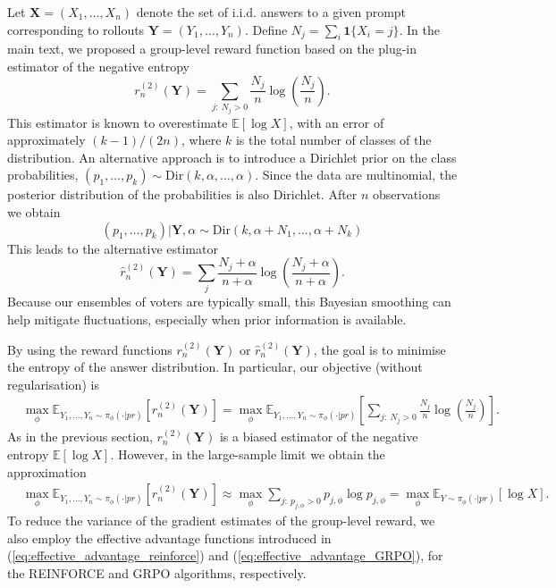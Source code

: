 Let $\mathbf{X} = (X_1, \dots, X_n)$ denote the set of i.i.d. answers to a given prompt corresponding to rollouts  $\mathbf{Y} = (Y_1, \dots, Y_n)$. Define $N_j = \sum_i \mathbf{1}\{X_i = j\}$. In the main text, we proposed a group-level reward function based on the plug-in estimator of the negative entropy
\begin{equation*}
    r_n^{(2)}(\mathbf{Y})=\sum_{j:\ N_j>0}\frac{N_j}{n}\log\left(\frac{N_j}{n}\right).
\end{equation*}
This estimator is known to overestimate $\mathbb{E}[\log X]$, with an error of approximately $(k-1)/(2n)$, where $k$ is the total number of classes of the distribution. An alternative approach is to introduce a Dirichlet prior on the class probabilities, $(p_1, \dots, p_k)\sim\text{Dir}(k, \alpha, \dots, \alpha)$.
Since the data are multinomial, the posterior distribution of the probabilities is also Dirichlet. After $n$ observations we obtain
$$
(p_1, \dots, p_k)|\mathbf{Y},\alpha\sim \text{Dir}(k, \alpha + N_1, \dots, \alpha+N_k)
$$
This leads to the alternative estimator
\begin{equation*}
    \hat r_n^{(2)}(\mathbf{Y}) = \sum_{j}\frac{N_j+\alpha}{n+\alpha}\log\left(\frac{N_j+\alpha}{n+\alpha}\right).
\end{equation*}
Because our ensembles of voters are typically small, this Bayesian smoothing can help mitigate fluctuations, especially when prior information is available.

By using the reward functions $r_n^{(2)}(\mathbf{Y})$ or $\hat r_n^{(2)}(\mathbf{Y})$, the goal is to minimise the entropy of the answer distribution. 
In particular, our objective (without regularisation) is
\begin{align*}
&\max_\phi \mathbb{E}_{Y_1, \dots, Y_n\sim \pi_\phi(\cdot|pr)}\left[r_n^{(2)}(\mathbf{Y})\right]= \max_\phi \mathbb{E}_{Y_1, \dots, Y_n\sim \pi_\phi(\cdot|pr)}\left[\sum_{j:\ N_j>0}\frac{N_j}{n}\log\left(\frac{N_j}{n}\right)\right].
\end{align*}
As in the previous section, $r_n^{(2)}(\mathbf{Y})$ is a biased estimator of the negative entropy $\mathbb{E}[\log X]$.  However, in the large-sample limit we obtain the approximation
\begin{align*}
&\max_\phi \mathbb{E}_{Y_1, \dots, Y_n\sim \pi_\phi(\cdot|pr)}\left[r_n^{(2)}(\mathbf{Y})\right]\approx \max_\phi \sum_{j:\ p_{j,\phi}>0} p_{j,\phi}\log p_{j,\phi}= \max_\phi \mathbb{E}_{Y\sim  \pi_{\phi}(\cdot|pr)}[\log X].
\end{align*}
To reduce the variance of the gradient estimates of the group-level reward, we also employ the effective advantage functions introduced in (\ref{eq:effective_advantage_reinforce}) and (\ref{eq:effective_advantage_GRPO}), for the REINFORCE and GRPO algorithms, respectively.


